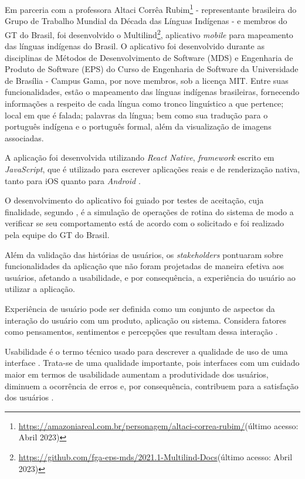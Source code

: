 Em parceria com a professora Altaci Corrêa Rubim\footnote{\url{https://amazoniareal.com.br/personagem/altaci-correa-rubim/}(último acesso: Abril 2023)} - representante
brasileira do Grupo de Trabalho Mundial da Década das Línguas Indígenas - e membros do GT do Brasil, foi desenvolvido o
Multilind\footnote{\url{https://github.com/fga-eps-mds/2021.1-Multilind-Docs}(último acesso: Abril 2023)}, aplicativo \textit{mobile} para mapeamento das línguas
indígenas do Brasil. O aplicativo foi desenvolvido durante as disciplinas de Métodos de Desenvolvimento de Software (MDS) e Engenharia de Produto de Software (EPS) do
Curso de Engenharia de Software da Universidade de Brasília - Campus Gama, por nove membros, sob a licença MIT. Entre suas funcionalidades, estão o mapeamento das línguas
indígenas brasileiras, fornecendo informações a respeito de cada língua como tronco linguístico a que pertence; local em que é falada; palavras da língua; bem como sua
tradução para o português indígena e o português formal, além da visualização de imagens associadas.

A aplicação foi desenvolvida utilizando \textit{React Native}, \textit{framework} escrito em \textit{JavaScript}, que é utilizado para escrever aplicações reais e de
renderização nativa, tanto para iOS quanto para \textit{Android} \cite{eiseman2017}.

O desenvolvimento do aplicativo foi guiado por testes de aceitação, cuja finalidade, segundo , é a simulação de operações de rotina do sistema de
modo a verificar se seu comportamento está de acordo com o solicitado e foi realizado pela equipe do GT do Brasil.

Além da validação das histórias de usuários, os \textit{stakeholders} pontuaram sobre funcionalidades da aplicação que não foram projetadas de maneira efetiva aos
usuários, afetando a usabilidade, e por consequência, a experiência do usuário ao utilizar a aplicação.

Experiência de usuário pode ser definida como um conjunto de aspectos da interação do usuário com um produto, aplicação ou sistema. Considera fatores como pensamentos,
sentimentos e percepções que resultam dessa interação \cite{tulis2013}.

Usabilidade é o termo técnico usado para descrever a qualidade de uso de uma interface \cite{bevan1995}. Trata-se de uma qualidade importante, pois interfaces com um
cuidado maior em termos de usabilidade aumentam a produtividade dos usuários, diminuem a ocorrência de erros e, por consequência, contribuem para a satisfação dos
usuários \cite{winckler2022}.

